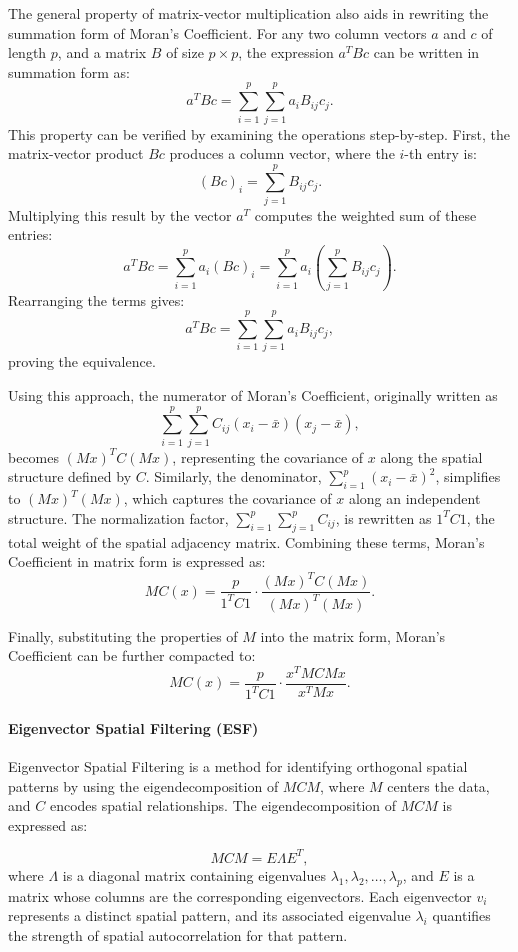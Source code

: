 \documentclass[12pt]{article}
\begin{document}
The general property of matrix-vector multiplication also aids in rewriting the summation form of Moran's Coefficient. For any two column vectors \( a \) and \( c \) of length \( p \), and a matrix \( B \) of size \( p \times p \), the expression \( a^T B c \) can be written in summation form as:
\[
  a^T B c = \sum_{i=1}^p \sum_{j=1}^p a_i B_{ij} c_j.
\]
This property can be verified by examining the operations step-by-step. First, the matrix-vector product \( Bc \) produces a column vector, where the \( i \)-th entry is:
\[
  (Bc)_i = \sum_{j=1}^p B_{ij} c_j.
\]
Multiplying this result by the vector \( a^T \) computes the weighted sum of these entries:
\[
  a^T B c = \sum_{i=1}^p a_i (Bc)_i = \sum_{i=1}^p a_i \left( \sum_{j=1}^p B_{ij} c_j \right).
\]
Rearranging the terms gives:
\[
  a^T B c = \sum_{i=1}^p \sum_{j=1}^p a_i B_{ij} c_j,
\]
proving the equivalence.

Using this approach, the numerator of Moran's Coefficient, originally written as 
\[
  \sum_{i=1}^p \sum_{j=1}^p C_{ij} (x_i - \bar{x})(x_j - \bar{x}),
\]
becomes \( (Mx)^T C (Mx) \), representing the covariance of \( x \) along the spatial structure defined by \( C \). Similarly, the denominator, \( \sum_{i=1}^p (x_i - \bar{x})^2 \), simplifies to \( (Mx)^T (Mx) \), which captures the covariance of \( x \) along an independent structure. The normalization factor, \( \sum_{i=1}^p \sum_{j=1}^p C_{ij} \), is rewritten as \( 1^T C 1 \), the total weight of the spatial adjacency matrix. Combining these terms, Moran’s Coefficient in matrix form is expressed as: 
\[
  MC(x) = \frac{p}{1^T C 1} \cdot \frac{(Mx)^T C (Mx)}{(Mx)^T (Mx)}.
\]

Finally, substituting the properties of \( M \) into the matrix form, Moran’s Coefficient can be further compacted to:
\[
  MC(x) = \frac{p}{1^T C 1} \cdot \frac{x^T M C M x}{x^T M x}.
\]


\paragraph{Eigenvector Spatial Filtering (ESF)}

Eigenvector Spatial Filtering is a method for identifying orthogonal spatial patterns by using the eigendecomposition of \( MCM \), where \( M \) centers the data, and \( C \) encodes spatial relationships. The eigendecomposition of \( MCM \) is expressed as:

\[
  MCM = E \Lambda E^T,
\]
where \( \Lambda \) is a diagonal matrix containing eigenvalues \( \lambda_1, \lambda_2, \ldots, \lambda_p \), and \( E \) is a matrix whose columns are the corresponding eigenvectors. Each eigenvector \( v_i \) represents a distinct spatial pattern, and its associated eigenvalue \( \lambda_i \) quantifies the strength of spatial autocorrelation for that pattern.
\end{document}
